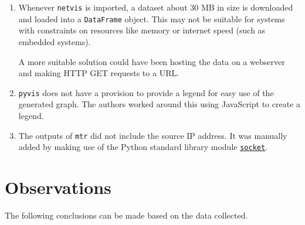 \documentclass[journal,12pt,twocolumn]{IEEEtran}
\begin{document}
\begin{enumerate}
     \item Whenever \texttt{netvis} is imported, a dataset about 30 MB in size
     is downloaded and loaded into a \texttt{DataFrame} object. This may not be
     suitable for systems with constraints on resources like memory or internet
     speed (such as embedded systems).

     A more suitable solution could have been hosting the data on a webserver
     and making HTTP GET requests to a URL.
     \item \texttt{pyvis} does not have a provision to provide a legend for easy
     use of the generated graph. The authors worked around this using JavaScript
     to create a legend.
     \item The outputs of \texttt{mtr} did not include the source IP address. It
     was manually added by making use of the Python standard library module
     \href{https://docs.python.org/3/library/socket.html}{\texttt{socket}}.
\end{enumerate}

\section{Observations}
The following conclusions can be made based on the data collected.
\end{document}
